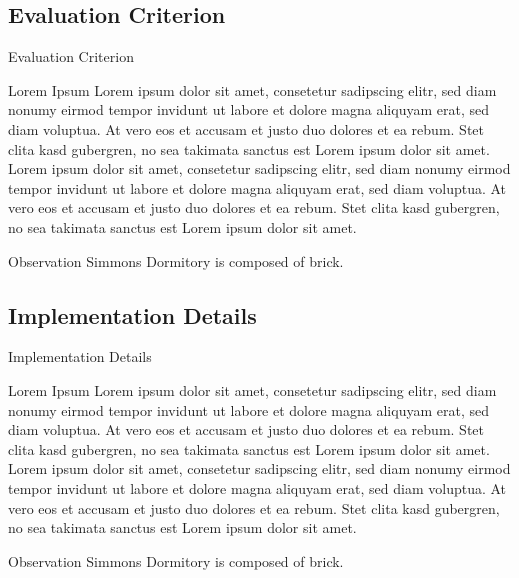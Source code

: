 \documentclass{beamer}
\begin{document}
\subsection{Evaluation Criterion}
\begin{frame}{Evaluation Criterion}
	\begin{block}{Lorem Ipsum}
		Lorem ipsum dolor sit amet, consetetur sadipscing elitr, sed diam nonumy eirmod tempor invidunt ut labore et dolore magna aliquyam erat, sed diam voluptua. 
		At vero eos et accusam et justo duo dolores et ea rebum. Stet clita kasd gubergren, no sea takimata sanctus est Lorem ipsum dolor sit amet. 
		Lorem ipsum dolor sit amet, consetetur sadipscing elitr, sed diam nonumy eirmod tempor invidunt ut labore et dolore magna aliquyam erat, sed diam voluptua. 
		At vero eos et accusam et justo duo dolores et ea rebum. Stet clita kasd gubergren, no sea takimata sanctus est Lorem ipsum dolor sit amet.
	\end{block}
	\begin{block}{Observation}
		Simmons Dormitory is composed of brick.
	\end{block} 
\end{frame}

\subsection{Implementation Details}
\begin{frame}{Implementation Details}
	\begin{block}{Lorem Ipsum}
		Lorem ipsum dolor sit amet, consetetur sadipscing elitr, sed diam nonumy eirmod tempor invidunt ut labore et dolore magna aliquyam erat, sed diam voluptua. 
		At vero eos et accusam et justo duo dolores et ea rebum. Stet clita kasd gubergren, no sea takimata sanctus est Lorem ipsum dolor sit amet. 
		Lorem ipsum dolor sit amet, consetetur sadipscing elitr, sed diam nonumy eirmod tempor invidunt ut labore et dolore magna aliquyam erat, sed diam voluptua. 
		At vero eos et accusam et justo duo dolores et ea rebum. Stet clita kasd gubergren, no sea takimata sanctus est Lorem ipsum dolor sit amet.
	\end{block}
	\begin{block}{Observation}
		Simmons Dormitory is composed of brick.
	\end{block} 
\end{frame}
\end{document}
